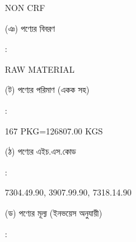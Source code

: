 \documentclass[12pt]{article}
\newcommand{\good}{RAW MATERIAL}
\newcommand{\pkg}{167 PKG=126807.00 KGS}
\newcommand{\crf}{NON CRF}
\newcommand{\crfdt}{}
\newcommand{\hscode}{7304.49.90, 3907.99.90, 7318.14.90}
\begin{document}
\begin{minipage}[t]{0.50\linewidth}
{\crf} \hspace{2em} {\crfdt}
\\
\end{minipage}
\begin{minipage}[t]{0.05\linewidth}
\hspace*{1em}
\end{minipage}
\begin{minipage}[t]{0.45\linewidth}
(ঞ) পণ্যের বিবরণ
\end{minipage}
\begin{minipage}[t]{0.02\linewidth}
:
\end{minipage}
\begin{minipage}[t]{0.50\linewidth}
{\good}
\\
\end{minipage}
\begin{minipage}[t]{0.05\linewidth}
\hspace*{1em}
\end{minipage}
\begin{minipage}[t]{0.45\linewidth}
(ট) পণ্যের পরিমাণ (একক সহ)
\end{minipage}
\begin{minipage}[t]{0.02\linewidth}
:
\end{minipage}
\begin{minipage}[t]{0.50\linewidth}
{\pkg}
\\
\end{minipage}
\begin{minipage}[t]{0.05\linewidth}
\hspace*{1em}
\end{minipage}
\begin{minipage}[t]{0.45\linewidth}
(ঠ) পণ্যের এইচ.এস.কোড
\end{minipage}
\begin{minipage}[t]{0.02\linewidth}
:
\end{minipage}
\begin{minipage}[t]{0.50\linewidth}
{\hscode}
\\
\end{minipage}
\begin{minipage}[t]{0.05\linewidth}
\hspace*{1em}
\end{minipage}
\begin{minipage}[t]{0.45\linewidth}
(ড) পণ্যের মূল্য (ইনভয়েস অনুযায়ী)
\end{minipage}
\begin{minipage}[t]{0.02\linewidth}
:
\end{minipage}
\end{document}
